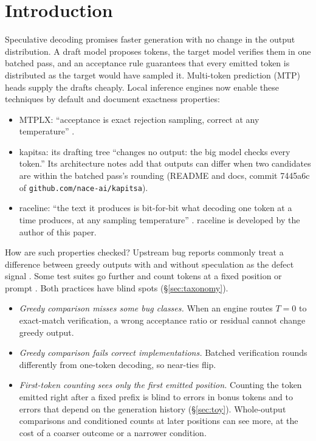 \documentclass[10pt]{article}
\theoremstyle{remark}
\begin{document}
\section{Introduction}
Speculative decoding \cite{leviathan2023,chen2023} promises faster generation with no change in the output distribution. A draft model proposes tokens, the target model verifies them in one batched pass, and an acceptance rule guarantees that every emitted token is distributed as the target would have sampled it. Multi-token prediction (MTP) heads supply the drafts cheaply. Local inference engines now enable these techniques by default and document exactness properties:
\begin{itemize}
\item MTPLX: ``acceptance is exact rejection sampling, correct at any temperature'' \cite{mtplxreadme}.
\item kapitsa: its drafting tree ``changes no output: the big model checks every token.'' Its architecture notes add that outputs can differ when two candidates are within the batched pass's rounding (README and docs, commit 7445a6c of \texttt{github.com/nace-ai/kapitsa}).
\item raceline: ``the text it produces is bit-for-bit what decoding one token at a time produces, at any sampling temperature'' \cite{racelinereadme}. raceline is developed by the author of this paper.
\end{itemize}

How are such properties checked? Upstream bug reports commonly treat a difference between greedy outputs with and without speculation as the defect signal \cite{llamacpp23302,llamacpp25618}. Some test suites go further and count tokens at a fixed position or prompt \cite{vllmtests,llamacpp29975}. Both practices have blind spots (\S\ref{sec:taxonomy}).
\begin{itemize}
\item \emph{Greedy comparison misses some bug classes.} When an engine routes $T{=}0$ to exact-match verification, a wrong acceptance ratio or residual cannot change greedy output.
\item \emph{Greedy comparison fails correct implementations.} Batched verification rounds differently from one-token decoding, so near-ties flip.
\item \emph{First-token counting sees only the first emitted position.} Counting the token emitted right after a fixed prefix is blind to errors in bonus tokens and to errors that depend on the generation history (\S\ref{sec:toy}). Whole-output comparisons and conditioned counts at later positions can see more, at the cost of a coarser outcome or a narrower condition.
\end{itemize}
\end{document}
